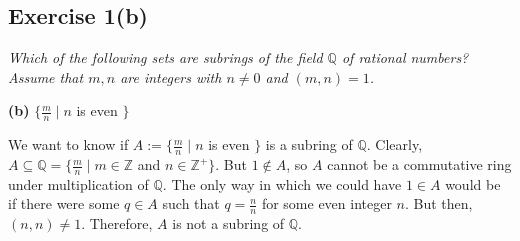\subsection*{Exercise 1(b)}
\textit{Which of the following sets are subrings of the field $\mathbb{Q}$ of rational numbers? Assume that $m,n$ are integers with $n \ne 0$ and $(m,n) = 1$.}

\textbf{(b)} $\{\frac{m}{n} \mid n$ is even $\}$

\vspace{5 mm}
We want to know if $A := \{\frac{m}{n} \mid n$ is even $\}$ is a subring of $\mathbb{Q}$. Clearly, $A \subseteq \mathbb{Q} = \{ \frac{m}{n} \mid m \in \mathbb{Z}$ and $n \in \mathbb{Z}^+ \}$. But $1 \not\in A$, so $A$ cannot be a commutative ring under multiplication of $\mathbb{Q}$. The only way in which we could have $1 \in A$ would be if there were some $q \in A$ such that $q = \frac{n}{n}$ for some even integer $n$. But then, $(n,n) \not= 1$. Therefore, $A$ is not a subring of $\mathbb{Q}$.